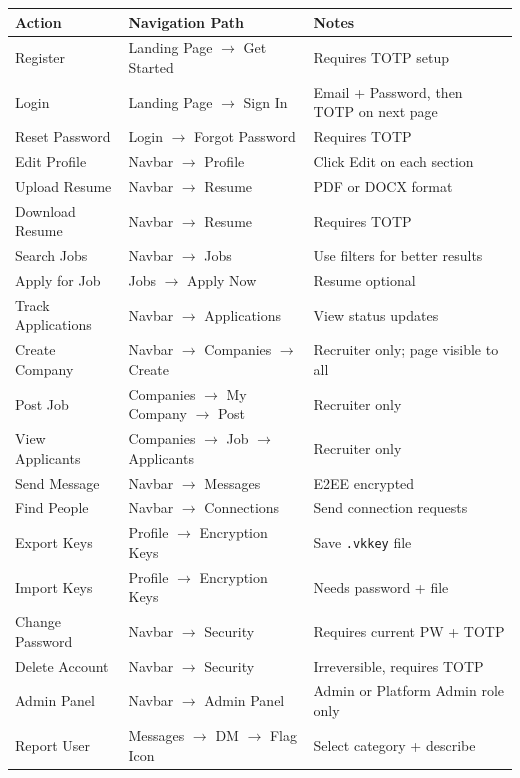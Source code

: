 \documentclass[12pt,a4paper]{article}
\begin{document}
\begin{longtable}{p{4cm}p{4cm}p{5.5cm}}
\toprule
\textbf{Action} & \textbf{Navigation Path} & \textbf{Notes} \\
\midrule
Register & Landing Page $\rightarrow$ Get Started & Requires TOTP setup \\
Login & Landing Page $\rightarrow$ Sign In & Email + Password, then TOTP on next page \\
Reset Password & Login $\rightarrow$ Forgot Password & Requires TOTP \\
Edit Profile & Navbar $\rightarrow$ Profile & Click Edit on each section \\
Upload Resume & Navbar $\rightarrow$ Resume & PDF or DOCX format \\
Download Resume & Navbar $\rightarrow$ Resume & Requires TOTP \\
Search Jobs & Navbar $\rightarrow$ Jobs & Use filters for better results \\
Apply for Job & Jobs $\rightarrow$ Apply Now & Resume optional \\
Track Applications & Navbar $\rightarrow$ Applications & View status updates \\
Create Company & Navbar $\rightarrow$ Companies $\rightarrow$ Create & Recruiter only; page visible to all \\
Post Job & Companies $\rightarrow$ My Company $\rightarrow$ Post & Recruiter only \\
View Applicants & Companies $\rightarrow$ Job $\rightarrow$ Applicants & Recruiter only \\
Send Message & Navbar $\rightarrow$ Messages & E2EE encrypted \\
Find People & Navbar $\rightarrow$ Connections & Send connection requests \\
Export Keys & Profile $\rightarrow$ Encryption Keys & Save \texttt{.vkkey} file \\
Import Keys & Profile $\rightarrow$ Encryption Keys & Needs password + file \\
Change Password & Navbar $\rightarrow$ Security & Requires current PW + TOTP \\
Delete Account & Navbar $\rightarrow$ Security & Irreversible, requires TOTP \\
Admin Panel & Navbar $\rightarrow$ Admin Panel & Admin or Platform Admin role only \\
Report User & Messages $\rightarrow$ DM $\rightarrow$ Flag Icon & Select category + describe \\
\bottomrule
\end{longtable}
\end{document}
